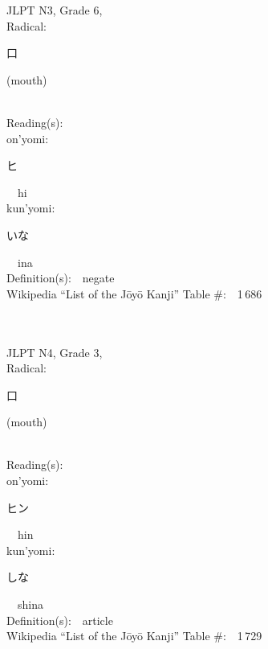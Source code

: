 \begin{multicols}{2}
{JLPT N3, Grade 6, \\Radical:\ \ {\begin{CJK}{UTF8}{min} 口 \end{CJK}} (mouth) } \\
Reading(s):\ \ \\
{\hspace*{1em}}on'yomi:\ \ \\
{\hspace*{2em}}{\begin{CJK}{UTF8}{min} ヒ \end{CJK}}\ \ hi\ \ \\
{\hspace*{1em}}kun'yomi:\ \ \\
{\hspace*{2em}}{\begin{CJK}{UTF8}{min} いな \end{CJK}}\ \ ina\ \ \\
Definition(s):\ \ negate \\
Wikipedia ``List of the J\=oy\=o Kanji'' Table \#:\ \ 1\,686 \\
\ \ \\
{\fontsize{34pt}{40pt}  }\ \ \\  %
{JLPT N4, Grade 3, \\Radical:\ \ {\begin{CJK}{UTF8}{min} 口 \end{CJK}} (mouth) } \\
Reading(s):\ \ \\
{\hspace*{1em}}on'yomi:\ \ \\
{\hspace*{2em}}{\begin{CJK}{UTF8}{min} ヒン \end{CJK}}\ \ hin\ \ \\
{\hspace*{1em}}kun'yomi:\ \ \\
{\hspace*{2em}}{\begin{CJK}{UTF8}{min} しな \end{CJK}}\ \ shina\ \ \\
Definition(s):\ \ article \\
Wikipedia ``List of the J\=oy\=o Kanji'' Table \#:\ \ 1\,729 \\

\end{multicols}
